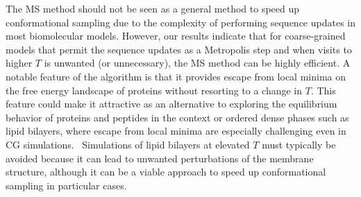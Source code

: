 \documentclass[
aip,
rsi,%
amsmath,amssymb,
reprint,%
]{revtex4-1}
\newcommand {\sigE}	{{\sigma_{\left < E \right >}}}
\newcommand {\SR}		{${\mathrm{S16}_{144}}$}
\begin{document}
The MS method should not be seen as a general method to speed up conformational sampling due to the complexity of performing sequence updates in most biomolecular models. However, our results indicate that for coarse-grained models that permit the sequence updates as a Metropolis step and when visits to higher $T$ is unwanted (or unnecessary), the MS method can be highly efficient. A notable feature of the algorithm is that it provides escape from local minima on the free energy landscape of proteins without resorting to a change in $T$. This feature could make it attractive as an alternative to exploring the equilibrium behavior of proteins and peptides in the context or ordered dense phases such as lipid bilayers, where escape from local minima are especially challenging even in CG simulations.~\cite{Bereau2015} Simulations of lipid bilayers at elevated $T$ must typically be avoided because it can lead to unwanted perturbations of the membrane structure, although it can be a viable approach to speed up conformational sampling in particular cases.~\cite{Ulmschneider2010} 



\end{document}
